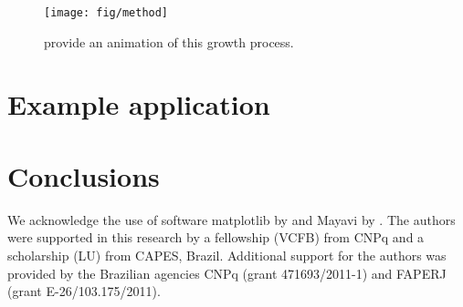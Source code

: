 \documentclass[twocolumn,final]{svjour3}
\begin{document}
\begin{figure}
    \texttt{[image: fig/method]}
    \caption{\citet{uieda_animation} provide an animation of this growth
    process.}
    \label{fig:method}
\end{figure}

\section{Example application}

\begin{sloppypar}
\end{sloppypar}



\section{Conclusions}
\begin{sloppypar}
\end{sloppypar}

\begin{acknowledgements}
We acknowledge the use of software
matplotlib by \citet{matplotlib} and
Mayavi by \citet{mayavi}.
The authors were supported in this research by
a fellowship (VCFB) from CNPq
and a scholarship (LU) from CAPES, Brazil.
Additional support for the authors
was provided by the Brazilian agencies
CNPq (grant 471693/2011-1) and FAPERJ (grant E-26/103.175/2011).
\end{acknowledgements}
\end{document}
